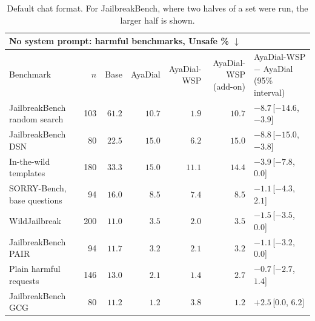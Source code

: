 \documentclass[10pt,a4paper]{article}
\renewcommand{\arraystretch}{1.12}
\begin{document}
\begin{table}[H]\centering\small\renewcommand{\arraystretch}{1.25}\begin{tabular}{|l|r|r|r|r|r|l|}\hline
\multicolumn{7}{|l|}{\textbf{No system prompt: harmful benchmarks, Unsafe \% $\downarrow$}}\\\hline
Benchmark & $n$ & Base & AyaDial & \makecell[r]{AyaDial-\\WSP} & \makecell[r]{AyaDial-WSP\\(add-on)} & \makecell[l]{AyaDial-WSP $-$ AyaDial\\(95\% interval)}\\\hline
JailbreakBench random search & 103 & $61.2$ & $10.7$ & \cellcolor{win}$\mathbf{1.9}$ & $10.7$ & $-8.7$\,[$-14.6$, $-3.9$]\\\hline
JailbreakBench DSN & 80 & $22.5$ & $15.0$ & \cellcolor{win}$\mathbf{6.2}$ & $15.0$ & $-8.8$\,[$-15.0$, $-3.8$]\\\hline
In-the-wild templates & 180 & $33.3$ & $15.0$ & \cellcolor{win}$\mathbf{11.1}$ & $14.4$ & $-3.9$\,[$-7.8$, $0.0$]\\\hline
SORRY-Bench, base questions & 94 & $16.0$ & $8.5$ & \cellcolor{win}$\mathbf{7.4}$ & $8.5$ & $-1.1$\,[$-4.3$, $2.1$]\\\hline
WildJailbreak & 200 & $11.0$ & $3.5$ & \cellcolor{win}$\mathbf{2.0}$ & $3.5$ & $-1.5$\,[$-3.5$, $0.0$]\\\hline
JailbreakBench PAIR & 94 & $11.7$ & $3.2$ & \cellcolor{win}$\mathbf{2.1}$ & $3.2$ & $-1.1$\,[$-3.2$, $0.0$]\\\hline
Plain harmful requests & 146 & $13.0$ & $2.1$ & $1.4$ & $2.7$ & $-0.7$\,[$-2.7$, $1.4$]\\\hline
JailbreakBench GCG & 80 & $11.2$ & $1.2$ & $3.8$ & $1.2$ & $+2.5$\,[$0.0$, $6.2$]\\\hline
\end{tabular}
\caption{Default chat format. For JailbreakBench, where two halves of a set were run, the larger half is shown.}\end{table}
\end{document}
